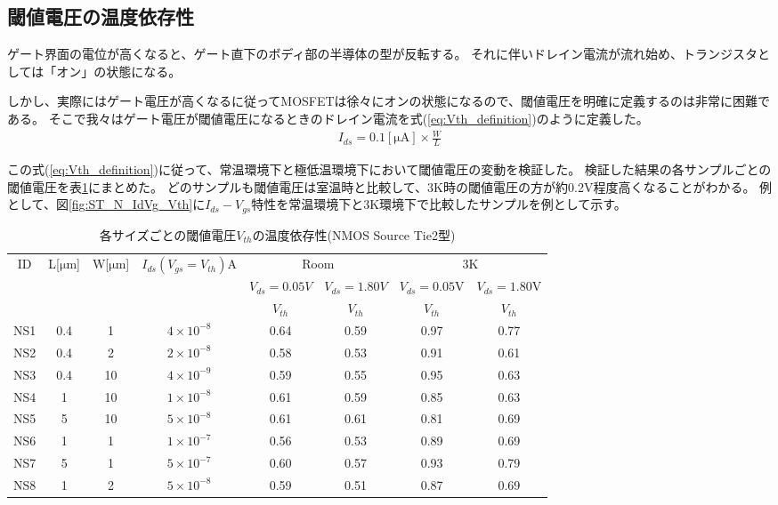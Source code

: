 		\subsection{閾値電圧の温度依存性}
			ゲート界面の電位が高くなると、ゲート直下のボディ部の半導体の型が反転する。
			それに伴いドレイン電流が流れ始め、トランジスタとしては「オン」の状態になる。
			
			しかし、実際にはゲート電圧が高くなるに従ってMOSFETは徐々にオンの状態になるので、閾値電圧を明確に定義するのは非常に困難である。
			そこで我々はゲート電圧が閾値電圧になるときのドレイン電流を式(\ref{eq:Vth_definition})のように定義した。
			\begin{eqnarray}
				I_{ds} = 0.1[\mathrm{\mu A}] \times \frac{W}{L}
				\label{eq:Vth_definition}
			\end{eqnarray}
			
			この式(\ref{eq:Vth_definition})に従って、常温環境下と極低温環境下において閾値電圧の変動を検証した。
			検証した結果の各サンプルごとの閾値電圧を表\ref{tab:Vth_temp}にまとめた。
			どのサンプルも閾値電圧は室温時と比較して、3K時の閾値電圧の方が約0.2V程度高くなることがわかる。
			例として、図\ref{fig:ST_N_IdVg_Vth}に$I_{ds}-V_{gs}$特性を常温環境下と3K環境下で比較したサンプルを例として示す。
			\begin{table}[htb]
			\centering
				\begin{tabular}{|c|cc|c|cc|cc|}
					\hline
					\multirow{3}{*}{ID} & \multirow{3}{*}{L[$\mathrm{\mu m}$]} & \multirow{3}{*}{W[$\mathrm{\mu m}$]} & \multirow{3}{*}{$I_{ds}(V_{gs}=V_{th})$A} & \multicolumn{2}{c|}{Room} & \multicolumn{2}{c|}{3K} \\ \cline{5-8} 
					 &  &  &  & \multicolumn{1}{c|}{$V_{ds} = 0.05V$} & $V_{ds} = 1.80V$ & \multicolumn{1}{c|}{$V_{ds} = 0.05$V} & $V_{ds} = 1.80$V \\
					 &  &  &  & \multicolumn{1}{c|}{$V_{th}$} & $V_{th}$ & \multicolumn{1}{c|}{$V_{th}$} & $V_{th}$ \\ \hline
					NS1 & 0.4 & 1 & $4 \times 10^{-8}$ & 0.64 & 0.59 & 0.97 & 0.77 \\
					NS2 & 0.4 & 2 & $2 \times 10^{-8}$ & 0.58 & 0.53 & 0.91 & 0.61 \\
					NS3 & 0.4 & 10 & $4 \times 10^{-9}$ & 0.59 & 0.55 & 0.95 & 0.63 \\
					NS4 & 1 & 10 & $1 \times 10^{-8}$ & 0.61 & 0.59 & 0.85 & 0.63 \\
					NS5 & 5 & 10 & $5 \times 10^{-8}$ & 0.61 & 0.61 & 0.81 & 0.69 \\
					NS6 & 1 & 1 & $1 \times 10^{-7}$ & 0.56 & 0.53 & 0.89 & 0.69 \\
					NS7 & 5 & 1 & $5 \times 10^{-7}$ & 0.60 & 0.57 & 0.93 & 0.79 \\
					NS8 & 1 & 2 & $5 \times 10^{-8}$ & 0.59 & 0.51 & 0.87 & 0.69 \\ \hline
				\end{tabular}
				\caption{各サイズごとの閾値電圧$V_{th}$の温度依存性(NMOS Source Tie2型)}
				\label{tab:Vth_temp}
			\end{table}
			\clearpage
			
